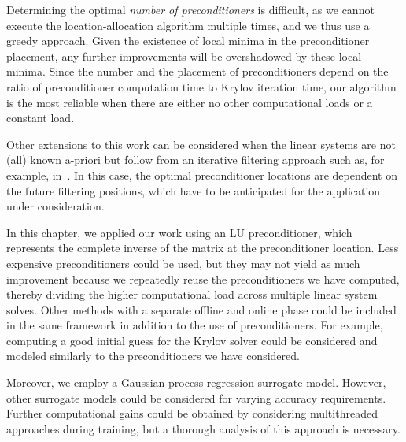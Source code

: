 Determining the optimal \textit{number of preconditioners} is difficult, as we cannot execute the location-allocation algorithm multiple times, and we thus use a greedy approach.
Given the existence of local minima in the preconditioner placement, any further improvements will be overshadowed by these local minima.
Since the number and the placement of preconditioners depend on the ratio of preconditioner computation time to Krylov iteration time, our algorithm is the most reliable when there are either no other computational loads or a constant load.

Other extensions to this work can be considered when the linear systems are not (all) known a-priori but follow from an iterative filtering approach such as, for example, in~\cite{vanharten2024}.
In this case, the optimal preconditioner locations are dependent on the future filtering positions, which have to be anticipated for the application under consideration.

In this chapter, we applied our work using an LU preconditioner, which represents the complete inverse of the matrix at the preconditioner location.
Less expensive preconditioners could be used, but they may not yield as much improvement because we repeatedly reuse the preconditioners we have computed, thereby dividing the higher computational load across multiple linear system solves.
Other methods with a separate offline and online phase could be included in the same framework in addition to the use of preconditioners.
For example, computing a good initial guess for the Krylov solver could be considered and modeled similarly to the preconditioners we have considered.

Moreover, we employ a Gaussian process regression surrogate model.
However, other surrogate models could be considered for varying accuracy requirements.
Further computational gains could be obtained by considering multithreaded approaches during training, but a thorough analysis of this approach is necessary.
